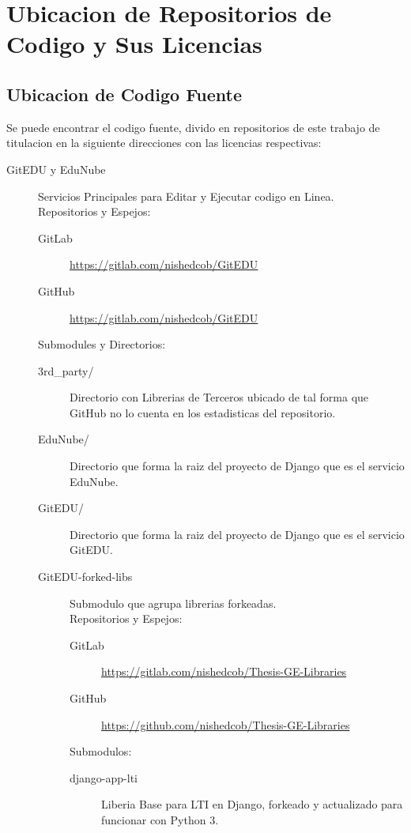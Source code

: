 
\chapter{Ubicacion de Repositorios de Codigo y Sus Licencias}
\label{AnexoI} 

\section{Ubicacion de Codigo Fuente}
Se puede encontrar el codigo fuente, divido en repositorios de este trabajo de titulacion en la siguiente direcciones con las licencias respectivas:
\begin{description}
	\item[GitEDU y EduNube] Servicios Principales para Editar y Ejecutar codigo en Linea.\\
    Repositorios y Espejos:
    \begin{description}
    	\item[GitLab] \url{https://gitlab.com/nishedcob/GitEDU}
        \item[GitHub] \url{https://gitlab.com/nishedcob/GitEDU}
    \end{description}
    Submodules y Directorios:
    \begin{description}
    	\item[3rd\_party/] Directorio con Librerias de Terceros ubicado de tal forma que GitHub no lo cuenta en los estadisticas del repositorio.
        \item[EduNube/] Directorio que forma la raiz del proyecto de Django que es el servicio EduNube.
        \item[GitEDU/] Directorio que forma la raiz del proyecto de Django que es el servicio GitEDU.
        \item[GitEDU-forked-libs] Submodulo que agrupa librerias forkeadas. \\
        Repositorios y Espejos:
        \begin{description}
        	\item[GitLab] \sloppy \url{https://gitlab.com/nishedcob/Thesis-GE-Libraries}
            \item[GitHub] \sloppy \url{https://github.com/nishedcob/Thesis-GE-Libraries}
        \end{description}
    	Submodulos:
        \begin{description}
        	\item[django-app-lti] Liberia Base para LTI en Django, forkeado y actualizado para funcionar con Python 3.\\

\end{description}
\end{description}
\end{description}
